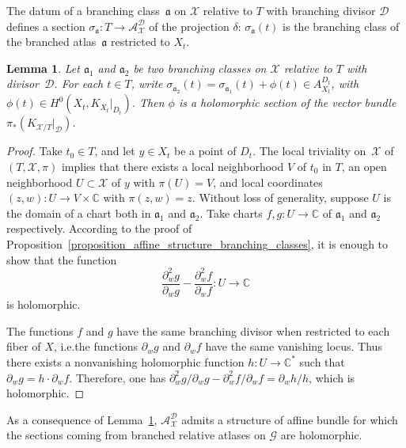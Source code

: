 \documentclass[10pt]{amsart}
\newcommand{\ie}{i.e.}
\theoremstyle{definition}
\theoremstyle{plain}
\newtheorem{lemma}[definition]{Lemma}
\begin{document}
The datum of a branching class~$\mathfrak a$ on $\mathcal X$ relative to $T$ with branching divisor $\mathcal D$ defines a section $\sigma_{\mathfrak a}: T \to \mathcal A_{\mathcal X}^{\mathcal D}$ of the projection $\delta$: $\sigma_{\mathfrak a}(t)$ is the branching class of the branched atlas~$\mathfrak a$ restricted to $X_t$.

\begin{lemma}\label{lemma_diff_atlas_proj}
Let $\mathfrak a_1$ and $\mathfrak a_2$ be two branching classes on $\mathcal X$ relative to $T$ with divisor~$\mathcal D$.
For each $t \!\in\! T$, write $\sigma_{\mathfrak a_2}(t) \!=\! \sigma_{\mathfrak a_1}(t) + \phi(t) \!\in\! A_{X_t}^{D_t}$, with $\phi(t) \!\in\! H^0(X_t, K_{X_t}|_{D_t})$.
Then $\phi$ is a holomorphic section of the vector bundle $\pi_*(K_{\mathcal X/T}|_{\mathcal D})$.
\end{lemma}

\begin{proof}
Take $t_0 \in T$, and let $y \in X_t$ be a point of $D_t$.
The local triviality on~$\mathcal X$ of $(T, \mathcal X, \pi)$ implies that there exists a local neighborhood $V$ of $t_0$ in $T$, an open neighborhood $U \subset \mathcal X$ of $y$ with $\pi(U) = V$, and local coordinates $(z, w): U \to V \times \mathbb C$ with $\pi(z, w) = z$.
Without loss of generality, suppose $U$ is the domain of a chart both in $\mathfrak a_1$ and $\mathfrak a_2$.
Take charts $f, g: U \to \mathbb C$ of $\mathfrak a_1$ and $\mathfrak a_2$ respectively.
According to the proof of Proposition~\ref{proposition_affine_structure_branching_classes}, it is enough to show that the function
\[
\frac{\partial^2_w g}{\partial_w g} - \frac{\partial^2_w f}{\partial_w f}: U \to \mathbb C
\]
is holomorphic.

The functions $f$ and $g$ have the same branching divisor when restricted to each fiber of $X$, \ie the functions $\partial_w g$ and $\partial_w f$ have the same vanishing locus.
Thus there exists a nonvanishing holomorphic function $h: U \to \mathbb C^*$ such that $\partial_w g = h \cdot \partial_w f$.
Therefore, one has $\partial^2_w g /\partial_w g - \partial^2_w f / \partial_w f = \partial_w h / h$, which is holomorphic.
\end{proof}

As a consequence of Lemma~\ref{lemma_diff_atlas_proj}, $\mathcal A_{\mathcal X}^{\mathcal D}$ admits a structure of affine bundle for which the sections coming from branched relative atlases on $\mathcal G$ are holomorphic.
\end{document}
